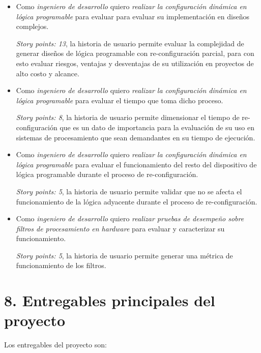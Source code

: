 \documentclass[
11pt, %
]{charter}
\begin{document}
\begin{itemize}
	\item Como \emph{ingeniero de desarrollo} quiero \emph{realizar la configuración dinámica en lógica programable} para evaluar para evaluar su implementación en diseños complejos.
	 
\emph{Story points: 13}, la historia de usuario permite evaluar la complejidad de generar diseños de lógica programable con re-configuración parcial, para con esto evaluar riesgos, ventajas y desventajas de su utilización en proyectos de alto costo y alcance.	
	
	\item Como \emph{ingeniero de desarrollo} quiero \emph{realizar la configuración dinámica en lógica programable} para evaluar el tiempo que toma dicho proceso. 
	
\emph{Story points: 8}, la historia de usuario permite dimensionar el tiempo de re-configuración que es un dato de importancia para la evaluación de su uso en sistemas de procesamiento que sean demandantes en su tiempo de ejecución.
	
	\item Como \emph{ingeniero de desarrollo} quiero \emph{realizar la configuración dinámica en lógica programable} para evaluar el funcionamiento del resto del dispositivo de lógica programable durante el proceso de re-configuración. 
	
\emph{Story points: 5}, la historia de usuario permite validar que no se afecta el funcionamiento de la lógica adyacente durante el proceso de re-configuración.

	\item Como \emph{ingeniero de desarrollo} quiero \emph{realizar pruebas de desempeño sobre filtros de procesamiento en hardware} para evaluar y caracterizar su funcionamiento.
	 
\emph{Story points: 5}, la historia de usuario permite generar una métrica de funcionamiento de los filtros.
\end{itemize}

	

\section{8. Entregables principales del proyecto}
\label{sec:entregables}

Los entregables del proyecto son:
\end{document}
